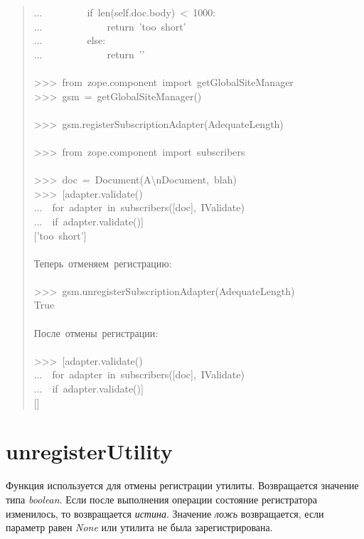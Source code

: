 \documentclass[a4paper,openany,twoside,final]{book}
\providecommand*{\DUroletitlereference}[1]{\textsl{#1}}
\begin{document}
\begin{quote}
{...~~~~~~~~~if~len(self.doc.body)~<~1000:\\
...~~~~~~~~~~~~~return~'too~short'\\
...~~~~~~~~~else:\\
...~~~~~~~~~~~~~return~'{}'\\
~\\
>{}>{}>~from~zope.component~import~getGlobalSiteManager\\
>{}>{}>~gsm~=~getGlobalSiteManager()\\
~\\
>{}>{}>~gsm.registerSubscriptionAdapter(AdequateLength)\\
~\\
>{}>{}>~from~zope.component~import~subscribers\\
~\\
>{}>{}>~doc~=~Document(\textquotedbl{}A\textbackslash{}nDocument\textquotedbl{},~\textquotedbl{}blah\textquotedbl{})\\
>{}>{}>~{[}adapter.validate()\\
...~~for~adapter~in~subscribers({[}doc{]},~IValidate)\\
...~~if~adapter.validate(){]}\\
{[}'too~short'{]}\\
~\\
Теперь~отменяем~регистрацию:\\
~\\
>{}>{}>~gsm.unregisterSubscriptionAdapter(AdequateLength)\\
True\\
~\\
После~отмены~регистрации:\\
~\\
>{}>{}>~{[}adapter.validate()\\
...~~for~adapter~in~subscribers({[}doc{]},~IValidate)\\
...~~if~adapter.validate(){]}\\
{[}{]}
}
\end{quote}


\section*{unregisterUtility%
  \label{unregisterutility}%
}

Функция используется для отмены регистрации утилиты.  Возвращается
значение типа \DUroletitlereference{boolean}.  Если после выполнения операции состояние
регистратора изменилось, то возвращается \DUroletitlereference{истина}.  Значение \DUroletitlereference{ложь}
возвращается, если параметр равен \DUroletitlereference{None} или утилита не была
зарегистрирована.
\end{document}
